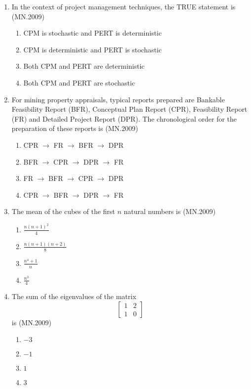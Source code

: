 \documentclass[journal]{IEEEtran}
\numberwithin{equation}{enumi}
\numberwithin{figure}{enumi}
\begin{document}
\begin{enumerate}
\item In the context of project management techniques, the TRUE statement is
\hfill{(MN.2009)}
\begin{enumerate}[label=(\Alph*)]
    \item CPM is stochastic and PERT is deterministic
    \item CPM is deterministic and PERT is stochastic
    \item Both CPM and PERT are deterministic
    \item Both CPM and PERT are stochastic
\end{enumerate}

\item For mining property appraisals, typical reports prepared are Bankable Feasibility Report (BFR), Conceptual Plan Report (CPR), Feasibility Report (FR) and Detailed Project Report (DPR). The chronological order for the preparation of these reports is
\hfill{(MN.2009)}
\begin{enumerate}[label=(\Alph*)]
    \item CPR $\to$ FR $\to$ BFR $\to$ DPR
    \item BFR $\to$ CPR $\to$ DPR $\to$ FR
    \item FR $\to$ BFR $\to$ CPR $\to$ DPR
    \item CPR $\to$ BFR $\to$ DPR $\to$ FR
\end{enumerate}

\item The mean of the cubes of the first $n$ natural numbers is
\hfill{(MN.2009)}
\begin{enumerate}[label=(\Alph*)]
    \item $\frac{n(n+1)^2}{4}$
    \item $\frac{n(n+1)(n+2)}{8}$
    \item $\frac{n^4 + 1}{n}$
    \item $\frac{n^3}{4}$
\end{enumerate}

\item The sum of the eigenvalues of the matrix 
\[\begin{bmatrix}1 & 2 \\1 & 0\end{bmatrix}\]is
\hfill{(MN.2009)}
\begin{enumerate}[label=(\Alph*)]
    \item $-3$
    \item $-1$
    \item $1$
    \item $3$
\end{enumerate}



\end{enumerate}
\end{document}
